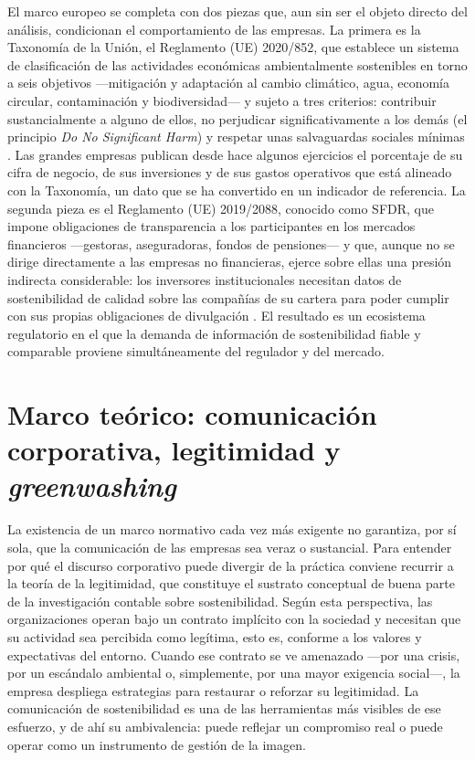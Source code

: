 El marco europeo se completa con dos piezas que, aun sin ser el objeto directo del análisis,
condicionan el comportamiento de las empresas. La primera es la Taxonomía de la Unión, el
Reglamento (UE) 2020/852, que establece un sistema de clasificación de las actividades
económicas ambientalmente sostenibles en torno a seis objetivos —mitigación y adaptación al
cambio climático, agua, economía circular, contaminación y biodiversidad— y sujeto a tres
criterios: contribuir sustancialmente a alguno de ellos, no perjudicar significativamente a
los demás (el principio \textit{Do No Significant Harm}) y respetar unas salvaguardas sociales
mínimas \parencite{taxonomia2020}. Las grandes empresas publican desde hace algunos ejercicios
el porcentaje de su cifra de negocio, de sus inversiones y de sus gastos operativos que está
alineado con la Taxonomía, un dato que se ha convertido en un indicador de referencia. La
segunda pieza es el Reglamento (UE) 2019/2088, conocido como SFDR, que impone obligaciones de
transparencia a los participantes en los mercados financieros —gestoras, aseguradoras, fondos
de pensiones— y que, aunque no se dirige directamente a las empresas no financieras, ejerce
sobre ellas una presión indirecta considerable: los inversores institucionales necesitan datos
de sostenibilidad de calidad sobre las compañías de su cartera para poder cumplir con sus
propias obligaciones de divulgación \parencite{sfdr2019}. El resultado es un ecosistema
regulatorio en el que la demanda de información de sostenibilidad fiable y comparable proviene
simultáneamente del regulador y del mercado.

\section{Marco teórico: comunicación corporativa, legitimidad y \textit{greenwashing}}
\label{sec:teoria}

La existencia de un marco normativo cada vez más exigente no garantiza, por sí sola, que la
comunicación de las empresas sea veraz o sustancial. Para entender por qué el discurso
corporativo puede divergir de la práctica conviene recurrir a la teoría de la legitimidad,
que constituye el sustrato conceptual de buena parte de la investigación contable sobre
sostenibilidad. Según esta perspectiva, las organizaciones operan bajo un contrato implícito
con la sociedad y necesitan que su actividad sea percibida como legítima, esto es, conforme a
los valores y expectativas del entorno. Cuando ese contrato se ve amenazado —por una crisis,
por un escándalo ambiental o, simplemente, por una mayor exigencia social—, la empresa
despliega estrategias para restaurar o reforzar su legitimidad. La comunicación de
sostenibilidad es una de las herramientas más visibles de ese esfuerzo, y de ahí su ambivalencia:
puede reflejar un compromiso real o puede operar como un instrumento de gestión de la imagen.


